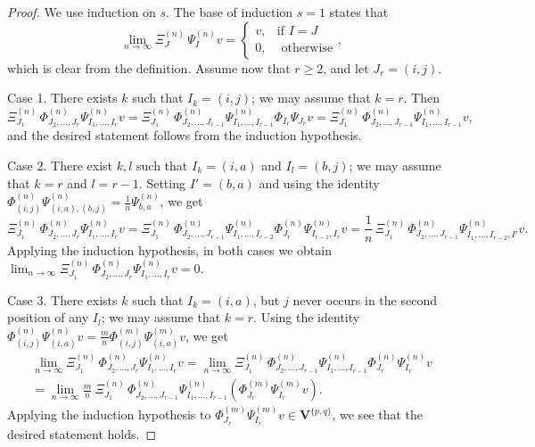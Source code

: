 \documentclass[12pt,reqno]{amsart}
\numberwithin{equation}{section}
\theoremstyle{plain}
\theoremstyle{definition}
\def\VV{\mathbf V}
\def\({\left(}
\def\){\right)}
\begin{document}
\begin{proof}
We use induction on $s$. The base of induction $s=1$ states that
\begin{equation*}
    \lim_{n\to \infty} \Xi^{(n)}_{J} \, \Psi_{I}^{(n)} v =
    \begin{cases}
        v, & \text{if $I = J$}\\
        0, & \text{ otherwise}
    \end{cases},
\end{equation*}
which is clear from the definition. Assume now that $r\ge2$, and let $J_r = (i,j)$.

Case 1. There exists $k$ such that $I_k = (i,j)$; we may assume that $k=r$. Then
\begin{equation*}
    \Xi^{(n)}_{J_1} \, \Phi_{J_2,\dots,J_r}^{(n)}
    \Psi_{I_1,\dots,I_r}^{(n)} v =
    \Xi^{(n)}_{J_1} \, \Phi_{J_2,\dots,J_{r-1}}^{(n)}
    \Psi_{I_1,\dots,I_{r-1}}^{(n)} \Phi_{I_r} \Psi_{J_r} v =
    \Xi^{(n)}_{J_1} \, \Phi_{J_2,\dots,J_{r-1}}^{(n)}
    \Psi_{I_1,\dots,I_{r-1}}^{(n)} v,
\end{equation*}
and the desired statement follows from the induction hypothesis.

Case 2. There exist $k,l$ such that $I_k = (i,a)$ and $I_l = (b,j)$; we may assume that $k=r$ and $l=r-1$. Setting $I' = (b,a)$ and using the identity $\Phi_{(i,j)}^{(n)} \Psi_{(i,a),(b,j)}^{(n)} = \frac 1n \Psi_{b,a}^{(n)}$, we get
\begin{equation*}
    \Xi^{(n)}_{J_1} \, \Phi_{J_2,\dots,J_r}^{(n)}
    \Psi_{I_1,\dots,I_r}^{(n)} v =
    \Xi^{(n)}_{J_1} \, \Phi_{J_2,\dots,J_{r-1}}^{(n)}
    \Psi_{I_1,\dots,I_{r-2}}^{(n)} \Phi_{J_r}^{(n)} \Psi_{I_{r-1},I_r}^{(n)} v =
    \frac 1n \, \Xi^{(n)}_{J_1} \, \Phi_{J_2,\dots,J_{r-1}}^{(n)}
    \Psi_{I_1,\dots,I_{r-2},I'}^{(n)} v.
\end{equation*}
Applying the induction hypothesis, in both cases we obtain
$\lim_{n\to \infty} \Xi^{(n)}_{J_1} \, \Phi_{J_2,\dots,J_r}^{(n)}
    \Psi_{I_1,\dots,I_r}^{(n)} v =0$.

Case 3. There exists $k$ such that $I_k = (i,a)$, but $j$ never occurs in the second position of any $I_l$; we may assume that $k=r$. Using the identity $\Phi_{(i,j)}^{(n)} \Psi_{(i,a)}^{(n)} v = \frac mn \Phi_{(i,j)}^{(m)} \Psi_{(i,a)}^{(m)}v$, we get
\begin{multline*}
    \lim_{n\to \infty} \Xi^{(n)}_{J_1} \, \Phi_{J_2,\dots,J_r}^{(n)}
    \Psi_{I_1,\dots,I_r}^{(n)} v =
    \lim_{n\to \infty} \Xi^{(n)}_{J_1} \, \Phi_{J_2,\dots,J_{r-1}}^{(n)}
    \Psi_{I_1,\dots,I_{r-1}}^{(n)} \Phi_{J_r}^{(n)} \Psi_{I_r}^{(n)} v
    \\
    =  \lim_{n\to \infty} \frac mn \ \Xi^{(n)}_{J_1} \, \Phi_{J_2,\dots,J_{r-1}}^{(n)}
    \Psi_{I_1,\dots,I_{r-1}}^{(n)} \( \Phi_{J_r}^{(m)} \Psi_{I_r}^{(m)} v \).
\end{multline*}
Applying the induction hypothesis to $\Phi_{J_r}^{(m)} \Psi_{I_r}^{(m)} v \in \VV^{\{p,q\}}$, we see that the desired statement holds.


\end{proof}
\end{document}

